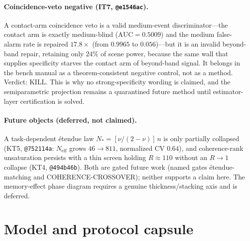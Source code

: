 \documentclass[10pt,onecolumn]{article}
\theoremstyle{plain}
\theoremstyle{definition}
\begin{document}
\paragraph{Coincidence-veto negative (IT7, \texttt{@e1546ac}).}
A contact-arm coincidence veto is a valid medium-event discriminator---the contact
arm is exactly medium-blind ($\mathrm{AUC}=0.5009$) and the medium false-alarm rate
is repaired $17.8\times$ (from $0.9965$ to $0.056$)---but it is an invalid
beyond-band repair, retaining only $24\%$ of scene power, because the same wall that
supplies specificity starves the contact arm of beyond-band signal. It belongs in
the bench manual as a theorem-consistent negative control, not as a method. Verdict:
KILL. This is why no strong-specificity wording is claimed, and the semiparametric
projection remains a quarantined future method until estimator-layer certification is
solved.

\paragraph{Future objects (deferred, not claimed).}
A task-dependent \'etendue law $N_\ast=[\nu/(2-\nu)]\,n$ is only partially collapsed
(KT5, \texttt{@752114a}: $N_{\mathrm{eff}}$ grows $46\to811$, normalized CV $0.64$),
and coherence-rank unsaturation persists with a thin screen holding $R\approx110$
without an $R\to1$ collapse (KT4, \texttt{@494b46b}). Both are gated future work
(named gates \'etendue-matching and COHERENCE-CROSSOVER); neither supports a claim
here. The memory-effect phase diagram requires a genuine thickness/stacking axis and
is deferred.

\section{Model and protocol capsule}\label{sec:s6}
\end{document}
